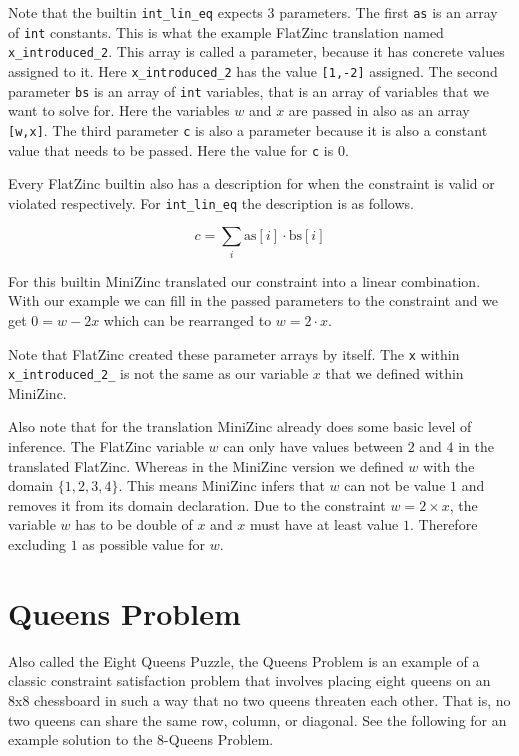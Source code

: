 Note that the builtin \verb|int_lin_eq| expects 3 parameters. The first \verb|as| is an array of \verb|int| constants. This is what the example FlatZinc translation named \verb|x_introduced_2|. This array is called a parameter, because it has concrete values assigned to it. Here \verb|x_introduced_2| has the value \verb|[1,-2]| assigned. The second parameter \verb|bs| is an array of \verb|int| variables, that is an array of variables that we want to solve for. Here the variables $w$ and $x$ are passed in also as an array \verb|[w,x]|. The third parameter \verb|c| is also a parameter because it is also a constant value that needs to be passed. Here the value for \verb|c| is $0$.

Every FlatZinc builtin also has a description for when the constraint is valid or violated respectively. For \verb|int_lin_eq| the description is as follows.

\begin{tcolorbox}[title=int\_lin\_eq builtin constraint]
	\begin{equation}
		c = \sum_{i} \text{as}[i] \cdot \text{bs}[i]
	\end{equation}
\end{tcolorbox}

For this builtin MiniZinc translated our constraint into a linear combination. With our example we can fill in the passed parameters to the constraint and we get $0 = w - 2x$ which can be rearranged to $w = 2 \cdot x$.

Note that FlatZinc created these parameter arrays by itself. The \verb|x| within \verb|x_introduced_2_| is not the same as our variable $x$ that we defined within MiniZinc.

Also note that for the translation MiniZinc already does some basic level of inference. The FlatZinc variable $w$ can only have values between $2$ and $4$ in the translated FlatZinc. Whereas in the MiniZinc version we defined $w$ with the domain $\{1, 2, 3, 4\}$. This means MiniZinc infers that $w$ can not be value $1$ and removes it from its domain declaration. Due to the constraint $w = 2 \times x$, the variable $w$ has to be double of $x$ and $x$ must have at least value $1$. Therefore excluding $1$ as possible value for $w$.

\section{Queens Problem} \label{sec:queens}

Also called the Eight Queens Puzzle, the Queens Problem is an example of a classic constraint satisfaction problem that involves placing eight queens on an 8x8 chessboard in such a way that no two queens threaten each other. That is, no two queens can share the same row, column, or diagonal. See the following for an example solution to the 8-Queens Problem.

